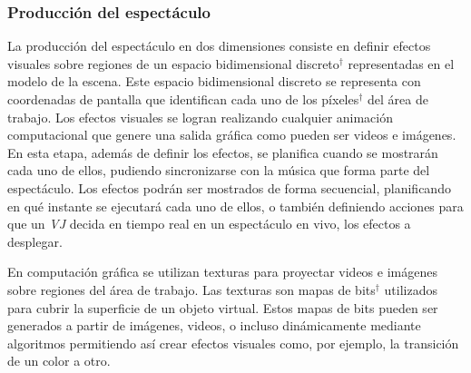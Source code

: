 \subsubsection{Producción del espectáculo}
La producción del espectáculo en dos dimensiones consiste en definir efectos visuales sobre regiones de un espacio bidimensional discreto$^\dagger$ representadas en el modelo de la escena. Este espacio bidimensional discreto se representa con coordenadas de pantalla que identifican cada uno de los píxeles$^\dagger$ del área de trabajo. Los efectos visuales se logran realizando cualquier animación computacional que genere una salida gráfica como pueden ser videos e imágenes.
En esta etapa, además de definir los efectos, se planifica cuando se mostrarán cada uno de ellos, pudiendo sincronizarse con la música que forma parte del espectáculo.
Los efectos podrán ser mostrados de forma secuencial, planificando en qué instante se ejecutará cada uno de ellos, o también definiendo acciones para que un \emph{VJ} decida en tiempo real en un espectáculo en vivo, los efectos a desplegar.

En computación gráfica se utilizan texturas para proyectar videos e imágenes sobre regiones del área de trabajo. Las texturas son mapas de bits$^\dagger$ utilizados para cubrir la superficie de un objeto virtual. Estos mapas de bits pueden ser generados a partir de imágenes, videos, o incluso dinámicamente mediante algoritmos permitiendo así crear efectos visuales como, por ejemplo, la transición de un color a otro.

